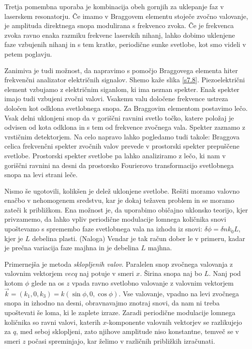 \documentclass[11pt,fleqn]{book} %
\begin{document}
Tretja pomembna uporaba je kombinacija obeh gornjih za uklepanje faz
v laserskem resonatorju. Če imamo v Braggovem elementu stoječe zvočno
valovanje, je amplituda direktnega snopa modulirana s frekvenco zvoka.
Če je frekvenca zvoka ravno enaka razmiku frekvenc laserskih nihanj,
lahko dobimo uklenjene faze vzbujenih nihanj in s tem kratke, periodične
sunke svetlobe, kot smo videli v petem poglavju.

Zanimiva je tudi možnost, da napravimo s pomočjo Braggovega elementa
hiter frekvenčni analizator električnih signalov. Shemo kaže slika
\ref{s7.8}. Piezoelektrični element vzbujamo z električnim siganlom,
ki ima neznan spekter. Enak spekter imajo tudi vzbujeni zvočni valovi.
Vsakemu valu določene frekvence ustreza določen kot odklona svetlobnega
snopa. Za Braggovim elementom postavimo lečo. Vsak delni uklonjeni
snop da v goriščni ravnini svetlo točko, katere položaj je odvisen
od kota odklona in s tem od frekvence zvočnega vala. Spekter zaznamo
z vrstičnim detektorjem. Na celo napravo lahko pogledamo tudi takole:
Braggova celica frekvenčni spekter zvočnih valov prevede v prostorski
spekter prepuščene svetlobe. Prostorski spekter svetlobe pa lahko
analiziramo z lečo, ki nam v goriščni ravnini na desni da prostorsko
Fourierovo transformacijo svetlobnega snopa na levi strani leče.

Nismo še ugotovili, kolikšen je delež uklonjene svetlobe. Rešiti moramo
valovno enačbo v nehomogenem sredstvu, kar je dokaj težaven problem
in se moramo zateči k približkom. Ena možnost je, da uporabimo običajno
uklonsko teorijo, kjer privzamemo, da lahko vpliv periodične modulacije
lomnega količnika snovi upoštevamo s spremembo faze svetlobnega vala
na izhodu iz snovi: $\delta\phi=\delta nk_{0}L$, kjer je $L$ debelina
plasti. (Naloga) Vendar je tak račun dober le v primeru, kadar je
prečna variacija faze majhna in je debelina $L$ majhna.

Primernejša je metoda \textit{sklopljenih valov}. Paralelen snop zvočnega
valovanja z valovnim vektorjem $vec{q}$ naj potuje v smeri $x$.
Širina snopa naj bo $L$. Nanj pod kotom $\phi$ glede na os $z$
vpada ravno svetlobno valovanje z valovnim vektorjem $\vec{k}=(k_{1},0,k_{3})=k(\sin\phi,0,\cos\phi)$.
Vse valovanje, vpadno na levi zvočnega snopa in izhodno na desni,
obravnavajmo znotraj snovi, da nam ni treba upoštevati še loma, ki
le zaplete izraze. Zaradi periodične modulacije lomnega količnika
so ravni valovi, katerih $x$-komponente valovnih vektorjev se razlikujejo
za $q$, med seboj sklopljeni, zato njihove amplitude niso konstantne,
temveč se v smeri $z$ počasi spreminjajo, kar želimo v različnih
približkih izračunati.
\end{document}
